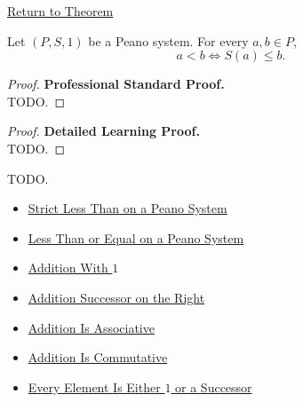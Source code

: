 \newpage
{}
\label{prf:strict-order-successor-characterization}

\begin{remark*}[Return]
\hyperref[thm:strict-order-successor-characterization]{Return to Theorem}
\end{remark*}

\begin{theorem*}
Let $(P,S,1)$ be a Peano system. For every $a,b \in P$,
\[
a<b
\Longleftrightarrow
S(a) \le b.
\]
\end{theorem*}

\begin{proof}
\textbf{Professional Standard Proof.}~\\
TODO.
\end{proof}

\begin{proof}
\textbf{Detailed Learning Proof.}~\\
TODO.
\end{proof}

\begin{remark*}
TODO.
\end{remark*}

\begin{dependencies}
\begin{itemize}
  \item \hyperref[def:strict-less-than-on-peano-system]{Strict Less Than on a Peano System}
  \item \hyperref[def:less-than-or-equal-on-peano-system]{Less Than or Equal on a Peano System}
  \item \hyperref[thm:addition-with-one]{Addition With $1$}
  \item \hyperref[thm:addition-successor-on-right]{Addition Successor on the Right}
  \item \hyperref[thm:addition-associative]{Addition Is Associative}
  \item \hyperref[thm:addition-commutative]{Addition Is Commutative}
  \item \hyperref[thm:every-element-is-one-or-a-successor]{Every Element Is Either $1$ or a Successor}
\end{itemize}
\end{dependencies}
